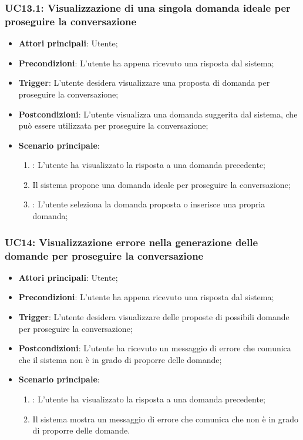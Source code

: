 \hypertarget{UC13.1}{}
\subsubsection{UC13.1: Visualizzazione di una singola domanda ideale per proseguire la conversazione}
\begin{itemize}
    \item \textbf{Attori principali}: Utente;
    \item \textbf{Precondizioni}: L'utente ha appena ricevuto una risposta dal sistema;
    \item \textbf{Trigger}: L'utente desidera visualizzare una proposta di domanda per proseguire la conversazione;
    \item \textbf{Postcondizioni}: L'utente visualizza una domanda suggerita dal sistema, che può essere utilizzata per proseguire la conversazione;
    \item \textbf{Scenario principale}:
    \begin{enumerate}
        \item {}: L'utente ha visualizzato la risposta a una domanda precedente;
        \item Il sistema propone una domanda ideale per proseguire la conversazione;
        \item {}: L'utente seleziona la domanda proposta o inserisce una propria domanda;
    \end{enumerate}
\end{itemize}

\hypertarget{UC14}{}
\subsubsection{UC14: Visualizzazione errore nella generazione delle domande per proseguire la conversazione}
\begin{itemize}
    \item \textbf{Attori principali}: Utente;
    \item \textbf{Precondizioni}: L'utente ha appena ricevuto una risposta dal sistema;
    \item \textbf{Trigger}: L'utente desidera visualizzare delle proposte di possibili domande per proseguire la conversazione;
    \item \textbf{Postcondizioni}: L'utente ha ricevuto un messaggio di errore che comunica che il sistema non è in grado di proporre delle domande;
    \item \textbf{Scenario principale}:
    \begin{enumerate}
        \item {}: L'utente ha visualizzato la risposta a una domanda precedente;
        \item Il sistema mostra un messaggio di errore che comunica che non è in grado di proporre delle domande.
    \end{enumerate}
\end{itemize}

